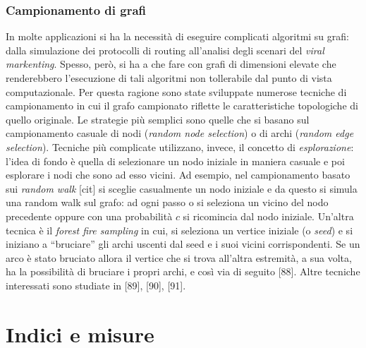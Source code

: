 \subsubsection{Campionamento di grafi}
In molte applicazioni si ha la necessit\`a di eseguire complicati algoritmi su grafi: dalla simulazione dei protocolli di routing all'analisi degli scenari del \textit{viral markenting}. Spesso, per\`o, si ha a che fare con grafi di dimensioni elevate che renderebbero l'esecuzione di tali algoritmi non tollerabile dal punto di vista computazionale. Per questa ragione sono state sviluppate numerose tecniche di campionamento in cui il grafo campionato riflette le caratteristiche topologiche di quello originale. Le strategie pi\`u semplici sono quelle che si basano sul campionamento casuale di nodi (\textit{random node selection}) o di archi (\textit{random edge selection}). 
Tecniche pi\`u complicate utilizzano, invece, il concetto di \textit{esplorazione}: l'idea di fondo \`e quella di selezionare un nodo iniziale in maniera casuale e poi esplorare i nodi che sono ad esso vicini. Ad esempio, nel campionamento basato sui \textit{random walk} [cit] si sceglie casualmente un nodo iniziale e da questo si simula una random walk sul grafo: ad ogni passo o si seleziona un vicino del nodo precedente oppure con una probabilit\`a $ c $ si ricomincia dal nodo iniziale. Un'altra tecnica \`e il \textit{forest fire sampling} in cui, si seleziona un vertice iniziale (o \textit{seed}) e si iniziano a ``bruciare'' gli archi uscenti dal seed e i suoi vicini corrispondenti. Se un arco \`e stato bruciato allora il vertice che si trova all'altra estremit\`a, a sua volta, ha la possibilit\`a di bruciare i propri archi, e cos\`i via di seguito [88]. Altre tecniche interessati sono studiate in [89], [90], [91].

\section{Indici e misure}
